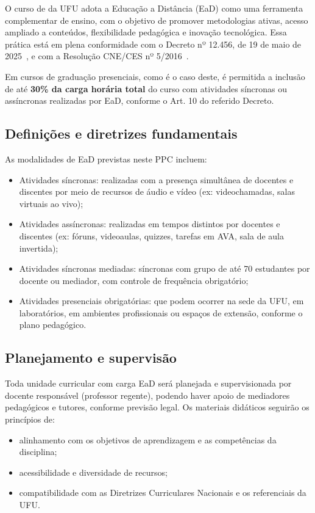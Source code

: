 O curso de \nomecursonovo da UFU adota a Educação a Distância (EaD) como uma ferramenta complementar de ensino, com o objetivo de promover metodologias ativas, acesso ampliado a conteúdos, flexibilidade pedagógica e inovação tecnológica. Essa prática está em plena conformidade com o Decreto nº 12.456, de 19 de maio de 2025~\cite{Decreto:12456:2025}, e com a Resolução CNE/CES nº 5/2016~\cite{MEC:CNE:CES:5:2016}.

Em cursos de graduação presenciais, como é o caso deste, é permitida a inclusão de até \textbf{30\% da carga horária total} do curso com atividades síncronas ou assíncronas realizadas por EaD, conforme o Art. 10 do referido Decreto.

\subsection{Definições e diretrizes fundamentais}

As modalidades de EaD previstas neste PPC incluem:

\begin{itemize}
    \item Atividades síncronas: realizadas com a presença simultânea de docentes e discentes por meio de recursos de áudio e vídeo (ex: videochamadas, salas virtuais ao vivo);
    \item Atividades assíncronas: realizadas em tempos distintos por docentes e discentes (ex: fóruns, videoaulas, quizzes, tarefas em AVA, sala de aula invertida);
    \item Atividades síncronas mediadas: síncronas com grupo de até 70 estudantes por docente ou mediador, com controle de frequência obrigatório;
    \item Atividades presenciais obrigatórias: que podem ocorrer na sede da UFU, em laboratórios, em ambientes profissionais ou espaços de extensão, conforme o plano pedagógico.
\end{itemize}

\subsection{Planejamento e supervisão}
\label{sec:planejamento_ead}

Toda unidade curricular com carga EaD será planejada e supervisionada por docente responsável (professor regente), podendo haver apoio de mediadores pedagógicos e tutores, conforme previsão legal. Os materiais didáticos seguirão os princípios de:
\begin{itemize}
    \item alinhamento com os objetivos de aprendizagem e as competências da disciplina;
    \item acessibilidade e diversidade de recursos;
    \item compatibilidade com as Diretrizes Curriculares Nacionais e os referenciais da UFU.
\end{itemize}

